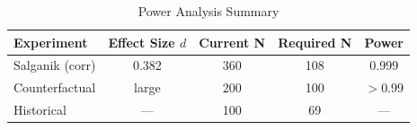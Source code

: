 \begin{table}[H]
\centering
\caption{Power Analysis Summary}
\label{tab:power_analysis}
\begin{tabular}{@{}lcccc@{}}
\toprule
\textbf{Experiment} & \textbf{Effect Size $d$} & \textbf{Current N} & \textbf{Required N} & \textbf{Power} \\
\midrule
Salganik (corr) & 0.382 & 360 & 108 & 0.999 \\
Counterfactual & large & 200 & 100 & $>$0.99 \\
Historical & --- & 100 & 69 & --- \\
\bottomrule
\end{tabular}
\end{table}